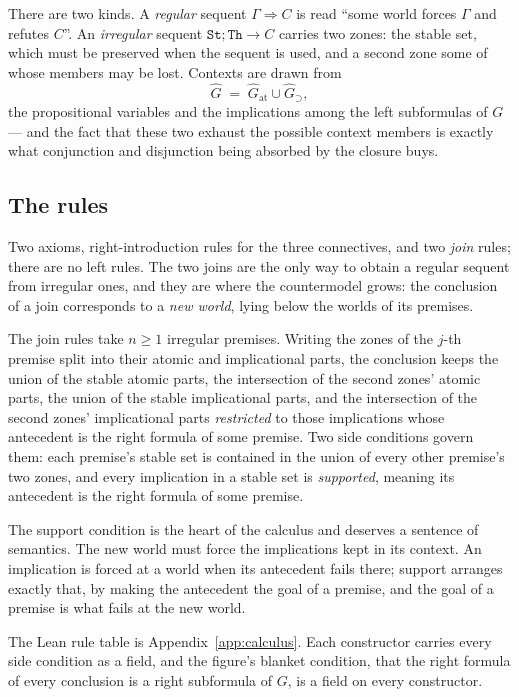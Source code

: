 \documentclass[11pt,a4paper]{article}
\begin{document}
There are two kinds. A \emph{regular} sequent $\Gamma \Rightarrow C$ is
read ``some world forces $\Gamma$ and refutes $C$''. An \emph{irregular}
sequent $\texttt{St} ; \texttt{Th} \to C$ carries two zones: the stable
set, which must be preserved when the sequent is used, and a second zone
some of whose members may be lost. Contexts are drawn from
\[
\hat G \;=\; \hat G_{\mathrm{at}} \cup \hat G_{\supset},
\]
the propositional variables and the implications among the left
subformulas of $G$ --- and the fact that these two exhaust the possible
context members is exactly what conjunction and disjunction being absorbed
by the closure buys.

\subsection{The rules}

Two axioms, right-introduction rules for the three connectives, and two
\emph{join} rules; there are no left rules. The two joins are the only way
to obtain a regular sequent from irregular ones, and they are where the
countermodel grows: the conclusion of a join corresponds to a \emph{new
world}, lying below the worlds of its premises.

The join rules take $n \geq 1$ irregular premises. Writing the zones of
the $j$-th premise split into their atomic and implicational parts, the
conclusion keeps the union of the stable atomic parts, the intersection of
the second zones' atomic parts, the union of the stable implicational
parts, and the intersection of the second zones' implicational parts
\emph{restricted} to those implications whose antecedent is the right
formula of some premise. Two side conditions govern them: each premise's
stable set is contained in the union of every other premise's two zones,
and every implication in a stable set is \emph{supported}, meaning its
antecedent is the right formula of some premise.

The support condition is the heart of the calculus and deserves a
sentence of semantics. The new world must force the implications kept in
its context. An implication is forced at a world when its antecedent fails
there; support arranges exactly that, by making the antecedent the goal of
a premise, and the goal of a premise is what fails at the new world.

The Lean rule table is Appendix~\ref{app:calculus}. Each constructor
carries every side condition as a field, and the figure's blanket
condition, that the right formula of every conclusion is a right
subformula of $G$, is a field on every constructor.
\end{document}
